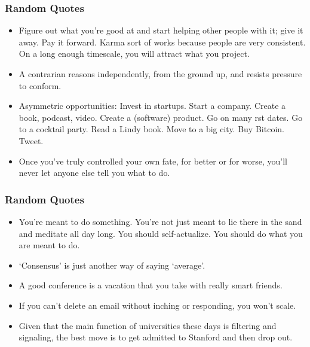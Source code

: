 \begin{frame}[fragile]\frametitle{ Random Quotes}

\begin{itemize}
\item Figure out what you’re good at and start helping other people with it;
give it away. Pay it forward. Karma sort of works because people are
very consistent. On a long enough timescale, you will attract what
you project.

\item  A contrarian reasons independently, from the ground
up, and resists pressure to conform.
\item Asymmetric opportunities: Invest in startups. Start a company. Create
a book, podcast, video. Create a (software) product. Go on many  rst
dates. Go to a cocktail party. Read a Lindy book. Move to a big city.
Buy Bitcoin. Tweet.

\item Once you’ve truly controlled your own fate, for better or for worse,
you’ll never let anyone else tell you what to do.
\end{itemize}

\end{frame}

\begin{frame}[fragile]\frametitle{ Random Quotes}

\begin{itemize}
\item You’re meant to do something. You’re not just meant to lie there in
the sand and meditate all day long. You should self-actualize. You
should do what you are meant to do.

\item ‘Consensus’ is just another way of saying ‘average’.

\item A good conference is a vacation that you take with really smart
friends.

\item If you can’t delete an email without  inching or responding, you won’t
scale.

\item Given that the main function of universities these days is  filtering and
signaling, the best move is to get admitted to Stanford and then drop
out.
\end{itemize}

\end{frame}

